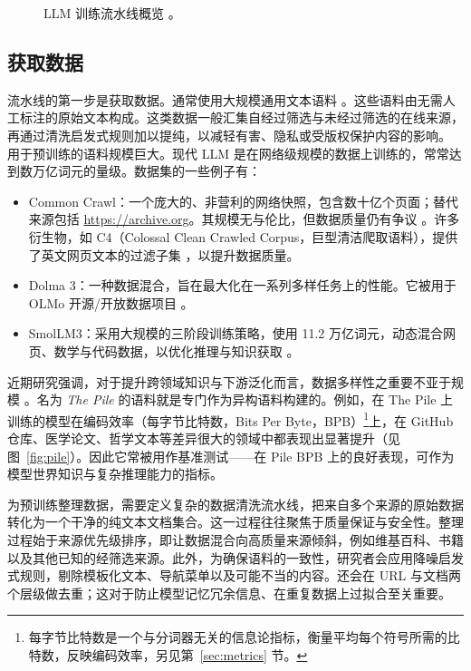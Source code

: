 \begin{figure}
    \centering
    
    \caption{LLM 训练流水线概览 \citep{radford2019language,minaee2024large}。}
    \label{fig:llm-training-pipeline}
\end{figure}

\subsection{获取数据}
流水线的第一步是获取数据。通常使用大规模通用文本语料 \citep{brown2020language}。这些语料由无需人工标注的原始文本构成。这类数据一般汇集自经过筛选与未经过筛选的在线来源，再通过清洗启发式规则加以提纯，以减轻有害、隐私或受版权保护内容的影响。
%
用于预训练的语料规模巨大。现代 LLM 是在网络级规模的数据上训练的，常常达到数万亿词元的量级。数据集的一些例子有：

\begin{itemize}
    \item Common Crawl：一个庞大的、非营利的网络快照，包含数十亿个页面；替代来源包括 \url{https://archive.org}。其规模无与伦比，但数据质量仍有争议 \citep{baack2024critical}。许多衍生物，如 C4（Colossal Clean Crawled Corpus，巨型清洁爬取语料），提供了英文网页文本的过滤子集 \citep{raffel2020exploringc4}，以提升数据质量。
    \item Dolma 3：一种数据混合，旨在最大化在一系列多样任务上的性能。它被用于 OLMo 开源/开放数据项目 \citep{olmo2025olmo3, soldaini2024dolma}。
    \item SmolLM3：采用大规模的三阶段训练策略，使用 11.2 万亿词元，动态混合网页、数学与代码数据，以优化推理与知识获取 \citep{bakouch2025smollm3}。
\end{itemize}
%
近期研究强调，对于提升跨领域知识与下游泛化而言，数据多样性之重要不亚于规模 \citep{gao2020pile800gbdatasetdiverse}。名为 {\em The Pile} 的语料就是专门作为异构语料构建的。例如，在 The Pile 上训练的模型在编码效率（每字节比特数，Bits Per Byte，BPB）\footnote{每字节比特数是一个与分词器无关的信息论指标，衡量平均每个符号所需的比特数，反映编码效率，另见第~\ref{sec:metrics} 节。}上，在 GitHub 仓库、医学论文、哲学文本等差异很大的领域中都表现出显著提升（见图~\ref{fig:pile}）。因此它常被用作基准测试——在 Pile BPB 上的良好表现，可作为模型世界知识与复杂推理能力的指标。

为预训练整理数据，需要定义复杂的数据清洗流水线，把来自多个来源的原始数据转化为一个干净的纯文本文档集合。这一过程往往聚焦于质量保证与安全性。整理过程始于来源优先级排序，即让数据混合向高质量来源倾斜，例如维基百科、书籍以及其他已知的经筛选来源。此外，为确保语料的一致性，研究者会应用降噪启发式规则，剔除模板化文本、导航菜单以及可能不当的内容。还会在 URL 与文档两个层级做去重；这对于防止模型记忆冗余信息、在重复数据上过拟合至关重要。

